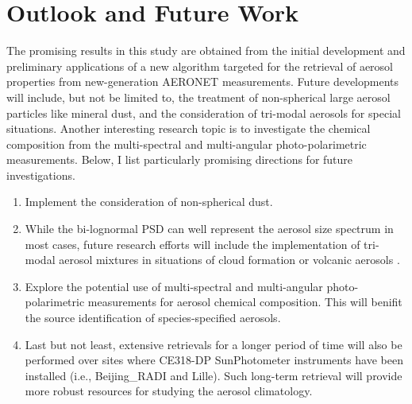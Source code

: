 \section{Outlook and Future Work}

The promising results in this study are obtained from the initial development
and preliminary applications of a new algorithm targeted for the retrieval of
aerosol properties from new-generation AERONET measurements. Future
developments will include, but not be limited to, the treatment of
non-spherical large aerosol particles like mineral dust, and the consideration
of tri-modal aerosols for special situations. Another interesting research 
topic is to investigate the chemical composition from the multi-spectral and
multi-angular photo-polarimetric measurements. Below, I list particularly
promising directions for future investigations.

\begin{enumerate}
\item Implement the consideration of non-spherical dust.
\item While the bi-lognormal PSD can well represent the aerosol size spectrum 
in most cases, future research efforts  will include the implementation of 
tri-modal aerosol mixtures in situations of cloud formation \citep{Eck12} 
or volcanic aerosols \citep{Eck10}.
\item Explore the potential use of multi-spectral and multi-angular 
photo-polarimetric measurements for aerosol chemical composition. This will 
benifit the source identification of species-specified aerosols.
\item Last but not least, extensive retrievals for a longer period of time 
will also be performed over sites where CE318-DP SunPhotometer instruments 
have been installed (i.e., Beijing\_RADI and Lille). Such long-term retrieval 
will provide more robust resources for studying the aerosol climatology. 
\end{enumerate}



